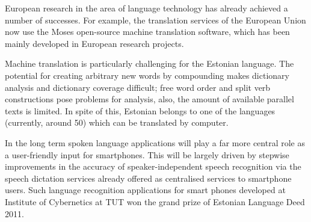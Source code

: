 \begin{multicols}{2}
European research in the area of language technology has already achieved a number of successes. For example, the translation services of the European Union now use the Moses open-source machine translation software, which has been mainly developed in European research projects. 

Machine translation is particularly challenging for the Estonian language. 
The potential for creating arbitrary new words by compounding makes dictionary analysis and dictionary coverage difficult; free word order and split verb constructions pose problems for analysis, also, the amount of available parallel texts is limited. 
In spite of this, Estonian belongs to one of the languages (currently, around 50) which can be translated by computer.

In the long term spoken language applications will play a far more central role as a user-friendly input for smartphones. This will be largely driven by stepwise improvements in the accuracy of speaker-independent speech recognition via the speech dictation services already offered as centralised services to smartphone users. 
Such language recognition applications for smart phones developed at Institute of Cybernetics at TUT won the grand prize of Estonian Language Deed 2011.


\end{multicols}

